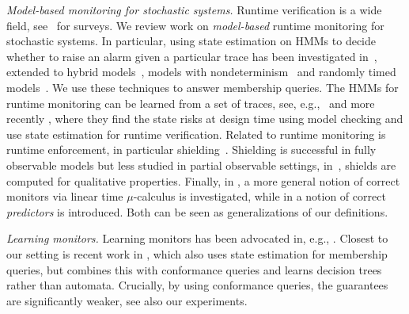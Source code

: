 \documentclass[runningheads]{llncs}
\newcommand{\sj}[2][]{\todo[color=red!50!white,#1]{\footnotesize{SJ: #2}}}
\newcommand{\lm}[2][]{\todo[color=cyan!50!white,#1]{\footnotesize{Luko: #2}}}
\renewcommand{\paragraph}[1]{\smallskip\noindent\emph{#1}}
\begin{document}
\paragraph{Model-based monitoring for stochastic systems.}
Runtime verification is a wide field, see~\cite{DBLP:journals/sttt/FalconeFM12,sanchezSurveyChallengesRuntime2019,DBLP:series/lncs/HavelundRR19} for surveys. We review work on \emph{model-based} runtime monitoring for stochastic systems. In particular, using state estimation on HMMs to  decide whether to raise an alarm given a particular trace has been investigated in~\cite{sistlaMonitoringTemporalProperties2008,stollerRuntimeVerificationState2012,wilcoxRuntimeVerificationStochastic2010}, extended to hybrid models~\cite{sistlaRuntimeMonitoringStochastic2012}, models with nondeterminism~\cite{jungesRuntimeMonitorsMarkov2021} and randomly timed models~\cite{DBLP:conf/tacas/BadingsVJSJ24}. We use these techniques to answer membership queries. The HMMs for runtime monitoring can be learned from a set of traces, see, e.g.,~\cite{babaeeEmphPreventPredictiveRunTime2018,babaeeAcceleratedLearningPredictive2019} and more recently \cite{cleavelandConservativeSafetyMonitors2023}, where they find the state risks at design time using model checking and use state estimation for runtime verification. %
Related to runtime monitoring is runtime enforcement, in particular shielding~\cite{DBLP:conf/tacas/BloemKKW15,RW87,DBLP:conf/aaai/FultonP18,jansen-et-al-concur-2020}. Shielding is successful in fully observable models but less studied in partial observable settings, in~\cite{DBLP:conf/aaai/Carr0JT23}, shields are computed for qualitative properties.
Finally, in \cite{acetoProbabilisticMonitorability2022}, a more general notion of correct monitors via linear time $\mu$-calculus is investigated, while in \cite{DBLP:journals/corr/abs-2412-11754} a notion of correct \emph{predictors} is introduced.
Both can be seen as generalizations of our definitions.

\paragraph{Learning monitors.}
Learning monitors has been advocated in, e.g., \cite{cairoliNeuralPredictiveMonitoring2021,DBLP:conf/nfm/PhanG0PSS20,DBLP:conf/atva/TorfahXJVS22,zolfagharianSMARLASafetyMonitoring2025}. Closest to our setting is recent work in \cite{jungesActiveLearningRuntime2025}, which also uses state estimation for membership queries, but combines this with conformance queries and learns decision trees rather than automata. Crucially, by using conformance queries, the guarantees are significantly weaker, see also our experiments. %
\end{document}
